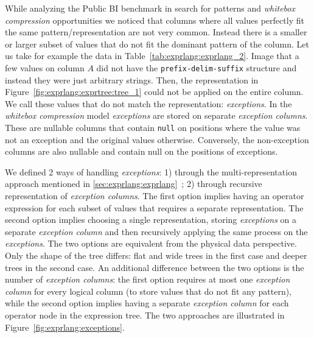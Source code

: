 While analyzing the Public BI benchmark in search for patterns and \textit{whitebox compression} opportunities we noticed that columns where all values perfectly fit the same pattern/representation are not very common. Instead there is a smaller or larger subset of values that do not fit the dominant pattern of the column. Let us take for example the data in Table~\ref{tab:exprlang:exprlang_2}. Image that a few values on column \(A\) did not have the \verb|prefix-delim-suffix| structure and instead they were just arbitrary strings. Then, the representation in Figure~\ref{fig:exprlang:exprtree:tree_1} could not be applied on the entire column. We call these values that do not match the representation: \textit{exceptions}. In the \textit{whitebox compression} model \textit{exceptions} are stored on separate \textit{exception columns}. These are nullable columns that contain \verb|null| on positions where the value was not an exception and the original values otherwise. Conversely, the non-exception columns are also nullable and contain null on the positions of exceptions.

We defined 2 ways of handling \textit{exceptions}: 1) through the multi-representation approach mentioned in \ref{sec:exprlang:exprlang}~; 2) through recursive representation of \textit{exception columns}. The first option implies having an operator expression for each subset of values that requires a separate representation. The second option implies choosing a single representation, storing \textit{exceptions} on a separate \textit{exception column} and then recursively applying the same process on the \textit{exceptions}. The two options are equivalent from the physical data perspective. Only the shape of the tree differs: flat and wide trees in the first case and deeper trees in the second case. An additional difference between the two options is the number of \textit{exception columns}: the first option requires at most one \textit{exception column} for every logical column (to store values that do not fit any pattern), while the second option implies having a separate \textit{exception column} for each operator node in the expression tree. The two approaches are illustrated in Figure~\ref{fig:exprlang:exceptions}.

